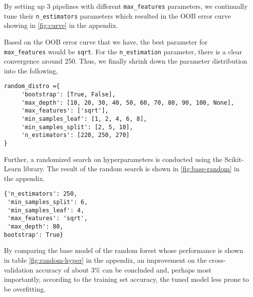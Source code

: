 By setting up 3 pipelines with different \verb|max_features| parameters, we continually tune their \verb|n_estimators| parameters which resulted in
the OOB error curve showing in \autoref{fig:curve} in the appendix.

Based on the OOB error curve that we have, the best parameter for \verb|max_features| would be \verb|sqrt|.
For the \verb|n_estimation| parameter, there is a clear convergence around 250.
Thus, we finally shrink down the parameter distribution into the following,

\begin{verbatim}
random_distro ={
     'bootstrap': [True, False],
     'max_depth': [10, 20, 30, 40, 50, 60, 70, 80, 90, 100, None],
     'max_features': ['sqrt'],
     'min_samples_leaf': [1, 2, 4, 6, 8],
     'min_samples_split': [2, 5, 10],
     'n_estimators': [220, 250, 270]
}
\end{verbatim}


Further, a randomized search on hyperparameters is conducted using the Scikit-Learn library.
The result of the random search is shown in \autoref{fig:base-random} in the appendix.

\begin{verbatim}
{'n_estimators': 250,
 'min_samples_split': 6,
 'min_samples_leaf': 4,
 'max_features': 'sqrt',
 'max_depth': 80,
bootstrap': True}
\end{verbatim}

By comparing the base model of the random forest whose performance is shown in table \autoref{fig:random-hyper} in the appendix, an improvement on the cross-validation accuracy of about 3\% can be concluded and, perhaps most importantly, according to the training set accuracy, the tuned model less prone to be overfitting.
